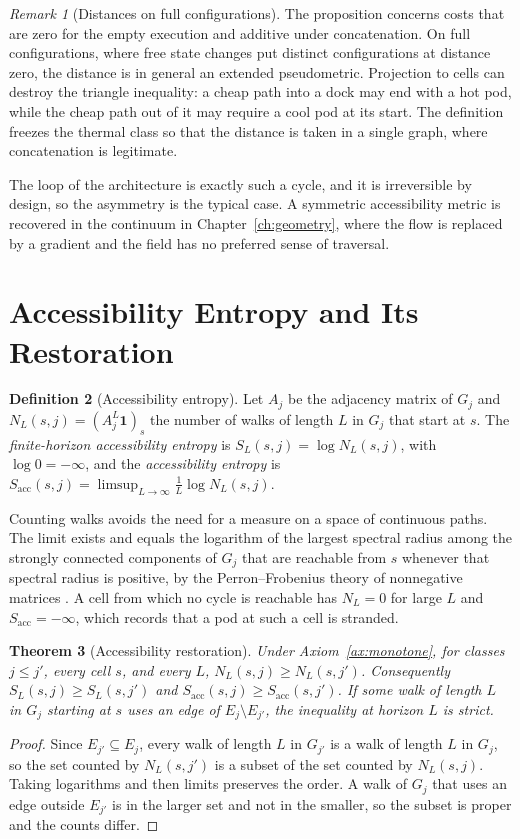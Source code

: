 \documentclass[11pt,openany]{book}
\theoremstyle{plain}
\newtheorem{theorem}{Theorem}[chapter]
\theoremstyle{definition}
\newtheorem{definition}[theorem]{Definition}
\theoremstyle{remark}
\newtheorem{remark}[theorem]{Remark}
\newcommand{\Sacc}{S_{\mathrm{acc}}}
\begin{document}
\begin{remark}[Distances on full configurations]
The proposition concerns costs that are zero for the empty execution and additive under concatenation. On full configurations, where free state changes put distinct configurations at distance zero, the distance is in general an extended pseudometric. Projection to cells can destroy the triangle inequality: a cheap path into a dock may end with a hot pod, while the cheap path out of it may require a cool pod at its start. The definition freezes the thermal class so that the distance is taken in a single graph, where concatenation is legitimate.
\end{remark}

The loop of the architecture is exactly such a cycle, and it is irreversible by design, so the asymmetry is the typical case. A symmetric accessibility metric is recovered in the continuum in Chapter~\ref{ch:geometry}, where the flow is replaced by a gradient and the field has no preferred sense of traversal.

\section{Accessibility Entropy and Its Restoration}

\begin{definition}[Accessibility entropy]
Let $A_j$ be the adjacency matrix of $G_j$ and $N_L(s,j)=(A_j^{L}\mathbf 1)_s$ the number of walks of length $L$ in $G_j$ that start at $s$. The \emph{finite-horizon accessibility entropy} is $S_L(s,j)=\log N_L(s,j)$, with $\log 0=-\infty$, and the \emph{accessibility entropy} is $\Sacc(s,j)=\limsup_{L\to\infty}\tfrac1L\log N_L(s,j)$.
\end{definition}

Counting walks avoids the need for a measure on a space of continuous paths. The limit exists and equals the logarithm of the largest spectral radius among the strongly connected components of $G_j$ that are reachable from $s$ whenever that spectral radius is positive, by the Perron--Frobenius theory of nonnegative matrices \cite{horn}. A cell from which no cycle is reachable has $N_L=0$ for large $L$ and $\Sacc=-\infty$, which records that a pod at such a cell is stranded.

\begin{theorem}[Accessibility restoration]
\label{thm:restoration}
Under Axiom~\ref{ax:monotone}, for classes $j\le j'$, every cell $s$, and every $L$, $N_L(s,j)\ge N_L(s,j')$. Consequently $S_L(s,j)\ge S_L(s,j')$ and $\Sacc(s,j)\ge\Sacc(s,j')$. If some walk of length $L$ in $G_j$ starting at $s$ uses an edge of $E_j\setminus E_{j'}$, the inequality at horizon $L$ is strict.
\end{theorem}
\begin{proof}
Since $E_{j'}\subseteq E_j$, every walk of length $L$ in $G_{j'}$ is a walk of length $L$ in $G_j$, so the set counted by $N_L(s,j')$ is a subset of the set counted by $N_L(s,j)$. Taking logarithms and then limits preserves the order. A walk of $G_j$ that uses an edge outside $E_{j'}$ is in the larger set and not in the smaller, so the subset is proper and the counts differ.
\end{proof}
\end{document}
